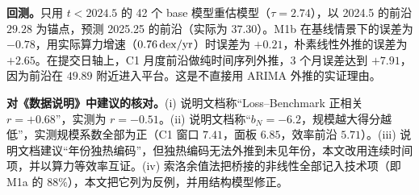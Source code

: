 \textbf{回测。}只用 $t<2024.5$ 的 42 个 base 模型重估模型（$\tau=2.74$），以 2024.5 的前沿 $29.28$ 为锚点，预测 2025.25 的前沿（实际为 $37.30$）。M1b 在基线情景下的误差为 $-0.78$，用实际算力增速（$0.76\,\mathrm{dex}/\mathrm{yr}$）时误差为 $+0.21$，朴素线性外推的误差为 $+2.65$。在提交日轴上，C1 月度前沿做纯时间序列外推，3 个月误差达到 $+7.91$，因为前沿在 $49.89$ 附近进入平台。这是不直接用 ARIMA 外推的实证理由。

\textbf{对《数据说明》中建议的核对。}(i) 说明文档称“Loss–Benchmark 正相关 $r=+0.68$”，实测为 $r=-0.51$。(ii) 说明文档称“$b_N=-6.2$，规模越大得分越低”，实测规模系数全部为正（C1 窗口 $7.41$，面板 $6.85$，效率前沿 $5.71$）。(iii) 说明文档建议“年份独热编码”，但独热编码无法外推到未见年份，本文改用连续时间项，并以算力等效率互证。(iv) 索洛余值法把桥接的非线性全部记入技术项（即 M1a 的 88\%），本文把它列为反例，并用结构模型修正。
